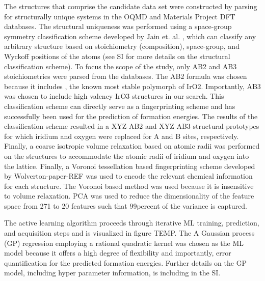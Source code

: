 

The structures that comprise the candidate data set were constructed by parsing for structurally unique systems in the OQMD and Materials Project DFT databases.
The structural uniqueness was performed using a space-group symmetry classification scheme developed by Jain et. al. \cite{Jain2018}, which can classify any arbitrary structure based on stoichiometry (composition), space-group, and Wyckoff positions of the atoms
 (see SI for more details on the structural classification scheme).
To focus the scope of the study, only AB2 and AB3 stoichiometries were parsed from the databases.
The AB2 formula was chosen because it includes \rIrOtwo, the known most stable polymorph of IrO2.
Importantly, AB3 was chosen to include high valency IrO3 structures in our search.
This classification scheme can directly serve as a fingerprinting scheme and has successfully been used for the prediction of formation energies.  %
The results of the classification scheme resulted in a XYZ AB2 and XYZ AB3 structural prototypes for which iridium and oxygen were replaced for A and B sites, respectively.
Finally, a coarse isotropic volume relaxation based on atomic radii was performed on the structures to accommodate the atomic radii of iridium and oxygen into the lattice.
Finally, a Voronoi tessellation based fingerprinting scheme developed by Wolverton-paper-REF was used to encode the relevant chemical information for each structure.
The Voronoi based method was used because it is insensitive to volume relaxation.
PCA was used to reduce the dimensionality of the feature space from 271  to 20 features such that 99percent of the variance is captured.


The active learning algorithm proceeds through iterative ML training, prediction, and acquisition steps and is visualized in figure TEMP.
The
A Gaussian process (GP) regression employing a rational quadratic kernel was chosen as the ML model because it offers a high degree of flexibility and importantly, error quantification for the predicted formation energies.
Further details on the GP model, including hyper parameter information, is including in the SI.


